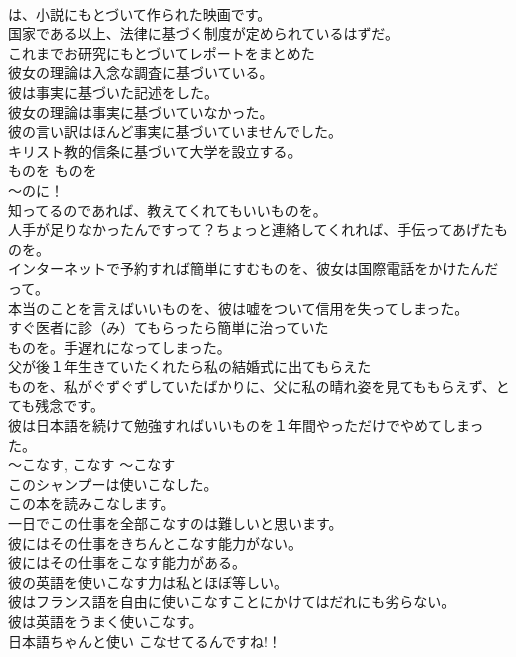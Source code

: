 \documentclass[8pt]{extreport}
\begin{document}
\begin{CJK}{UTF8}{min}
\\	は、小説にもとづいて作られた映画です。  
\\	国家である以上、法律に基づく制度が定められているはずだ。  
\\	これまでお研究にもとづいてレポートをまとめた  
\\	彼女の理論は入念な調査に基づいている。   
\\	彼は事実に基づいた記述をした。   
\\	彼女の理論は事実に基づいていなかった。   
\\	彼の言い訳はほんど事実に基づいていませんでした。   
\\	キリスト教的信条に基づいて大学を設立する。   
\\	ものを	ものを	
\\	〜のに！	
\\	知ってるのであれば、教えてくれてもいいものを。  
\\	人手が足りなかったんですって？ちょっと連絡してくれれば、手伝ってあげたものを。  
\\	インターネットで予約すれば簡単にすむものを、彼女は国際電話をかけたんだって。  
\\	本当のことを言えばいいものを、彼は嘘をついて信用を失ってしまった。  
\\	すぐ医者に診（み）てもらったら簡単に治っていた
\\	ものを。手遅れになってしまった。  
\\	父が後１年生きていたくれたら私の結婚式に出てもらえた
\\	ものを、私がぐずぐずしていたばかりに、父に私の晴れ姿を見てももらえず、とても残念です。  
\\	彼は日本語を続けて勉強すればいいものを１年間やっただけでやめてしまった。  
\\	〜こなす, こなす	〜こなす	
\\	このシャンプーは使いこなした。  
\\	この本を読みこなします。  
\\	一日でこの仕事を全部こなすのは難しいと思います。   
\\	彼にはその仕事をきちんとこなす能力がない。   
\\	彼にはその仕事をこなす能力がある。   
\\	彼の英語を使いこなす力は私とほぼ等しい。  
\\	彼はフランス語を自由に使いこなすことにかけてはだれにも劣らない。   
\\	彼は英語をうまく使いこなす。   
\\	日本語ちゃんと使い こなせてるんですね!！  

\end{CJK}
\end{document}
